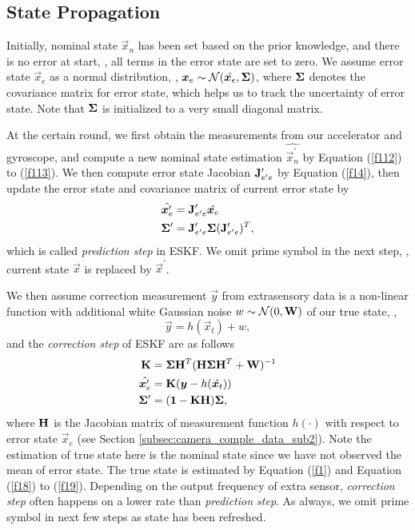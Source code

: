 \subsection{State Propagation}
\label{subsec:ESKF_IMU_sub4}

Initially, nominal state $\vec{x}_n$ has been set based on the prior knowledge, and there is no error at start, \ie, all terms in the error state are set to zero. We assume error state $\vec{x}_e$ as a normal distribution, \ie, $\boldsymbol{x}_e \sim \mathcal{N}(\hat{\boldsymbol{x}_e}, \mathbf{\Sigma})$, where $\mathbf{\Sigma}$ denotes the covariance matrix for error state, which helps us to track the uncertainty of error state. Note that $\mathbf{\Sigma}$ is initialized to a very small diagonal matrix.

At the certain round, we first obtain the measurements from our accelerator and gyroscope, and compute a new nominal state estimation $\hat{\vec{x}_n^\prime}$ by Equation (\ref{f112}) to (\ref{f113}). We then compute error state Jacobian $\mathbf{J}_{e^\prime e}^\prime$ by Equation (\ref{f14}), then update the error state and covariance matrix of current error state by
\begin{align} \label{f22}
\hat{\boldsymbol{x}_e^\prime} &= \mathbf{J}_{e^\prime e}^\prime\hat{\boldsymbol{x}_e} \\
\mathbf{\Sigma}^\prime &= \mathbf{J}_{e^\prime e}^\prime \mathbf{\Sigma} (\mathbf{J}_{e^\prime e}^\prime)^T,
\end{align}
which is called \textit{prediction step} in ESKF. We omit prime symbol in the next step, \ie, current state $\vec{x}$ is replaced by $\vec{x}^\prime$.

We then assume correction measurement $\vec{y}$ from extrasensory data is a non-linear function with additional white Gaussian noise $w \sim \mathcal{N}(0, \mathbf{W})$ of our true state, \ie,
\begin{equation}\label{f17}
	\vec{y} = h(\vec{x}_t) + w,
\end{equation}
and the \textit{correction step} of ESKF are as follows
\begin{align}\label{f30}
	\mathbf{K} &= \mathbf{\Sigma}\mathbf{H}^T(\mathbf{H}\mathbf{\Sigma}\mathbf{H}^T+\mathbf{W})^{-1} \\
	\hat{\boldsymbol{x}_e^\prime} &= \mathbf{K} (\boldsymbol{y} - h(\hat{\boldsymbol{x}_t})) \\
	\mathbf{\Sigma}^\prime &= (\mathbf{1} - \mathbf{K}\mathbf{H})\mathbf{\Sigma},
\end{align}
where $\mathbf{H}$ is the Jacobian matrix of measurement function $h(\cdot)$ with respect to error state $\vec{x}_e$ (see Section \ref{subsec:camera_comple_data_sub2}). Note the estimation of true state here is the nominal state since we have not observed the mean of error state. The true state is estimated by Equation (\ref{f1}) and Equation (\ref{f18}) to (\ref{f19}). Depending on the output frequency of extra sensor, \textit{correction step} often happens on a lower rate than \textit{prediction step}. As always, we omit prime symbol in next few steps as state has been refreshed.  

